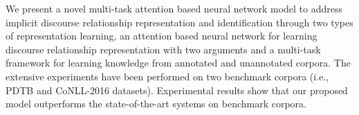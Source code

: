 We present a novel multi-task attention based neural network model to address implicit discourse relationship representation and identification through two types of representation learning, an attention based neural network for learning discourse relationship representation with two arguments and a multi-task framework for learning knowledge from annotated and unannotated corpora. The extensive experiments have been performed on two benchmark corpora (i.e., PDTB and CoNLL-2016 datasets). Experimental results show that our proposed model outperforms the state-of-the-art systems on benchmark corpora.
